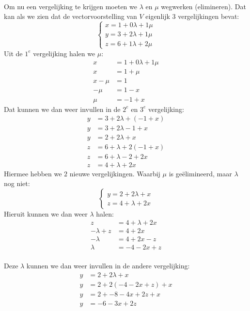 Om nu een vergelijking te krijgen moeten we $ \lambda $  en $ \mu $ wegwerken (elimineren). Dat kan als we zien dat de vectorvoorstelling van $ V $ eigenlijk 3 vergelijkingen bevat:
\[\begin{cases}
x =  1 + 0\lambda + 1\mu\\
y =  3 + 2\lambda  + 1\mu\\
z = 6 + 1 \lambda + 2\mu  
\end{cases}
\] 
Uit de $ 1^{e}$ vergelijking halen we $ \mu $:
\begin{align*}
  x &= 1 + 0\lambda + 1\mu \\
  x &= 1 + \mu \\
  x - \mu &= 1 \\
  -\mu &= 1 - x \\
  \mu &= -1 + x
\end{align*}
Dat kunnen we dan weer invullen in de $ 2^{e}$ en $ 3^{e}$ vergelijking:
\begin{align*}
  y &= 3 + 2\lambda  + (-1 + x) \\
  y &= 3 + 2\lambda -1 + x \\
  y &= 2 + 2\lambda + x
\end{align*}
\begin{align*}
  z &= 6 + \lambda + 2(-1 + x) \\
  z &= 6 + \lambda -2 + 2x \\
  z &= 4 + \lambda + 2x
\end{align*}
Hiermee hebben we $2$ nieuwe vergelijkingen. Waarbij $\mu$ is ge\"elimineerd, maar $\lambda$ nog niet:
\[\begin{cases}
  y = 2 + 2\lambda + x \\
  z = 4 + \lambda + 2x
\end{cases}
\] 
Hieruit kunnen we dan weer $\lambda$ halen: 
\begin{align*}
  z &= 4 + \lambda + 2x \\
  -\lambda + z &= 4 + 2x \\
  -\lambda &= 4 + 2x - z \\
  \lambda &= -4 - 2x + z \\
\end{align*}

Deze $\lambda$ kunnen we dan weer invullen in de andere vergelijking:
\begin{align*}
  y &= 2 + 2\lambda + x \\
  y &= 2 + 2(-4 -2x + z) + x \\
  y &= 2 + -8 -4x + 2z + x \\
  y &= -6 -3x + 2z \\
\end{align*}

